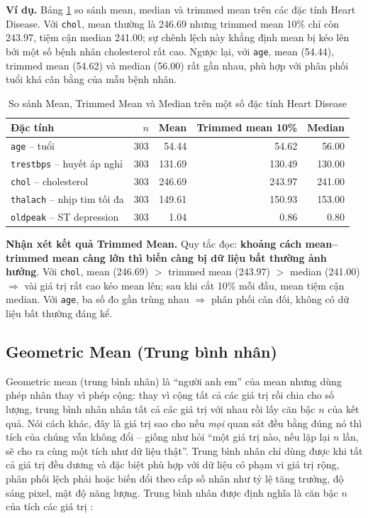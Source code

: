 \textbf{Ví dụ.} Bảng \ref{tab:chapter1_trimmed_example} so sánh mean, median và trimmed mean trên các đặc tính Heart Disease. Với \texttt{chol}, mean thường là 246.69 nhưng trimmed mean 10\% chỉ còn 243.97, tiệm cận median 241.00; sự chênh lệch này khẳng định mean bị kéo lên bởi một số bệnh nhân cholesterol rất cao. Ngược lại, với \texttt{age}, mean (54.44), trimmed mean (54.62) và median (56.00) rất gần nhau, phù hợp với phân phối tuổi khá cân bằng của mẫu bệnh nhân.

\begin{table}[H]
\centering
\caption{So sánh Mean, Trimmed Mean và Median trên một số đặc tính Heart Disease}
\label{tab:chapter1_trimmed_example}
\small
\begin{tabular}{lrrrr}
\toprule
Đặc tính & $n$ & Mean & Trimmed mean 10\% & Median \\
\midrule
\texttt{age} -- tuổi & 303 & 54.44 & 54.62 & 56.00 \\
\texttt{trestbps} -- huyết áp nghỉ & 303 & 131.69 & 130.49 & 130.00 \\
\texttt{chol} -- cholesterol & 303 & 246.69 & 243.97 & 241.00 \\
\texttt{thalach} -- nhịp tim tối đa & 303 & 149.61 & 150.93 & 153.00 \\
\texttt{oldpeak} -- ST depression & 303 & 1.04 & 0.86 & 0.80 \\
\bottomrule
\end{tabular}
\end{table}

\textbf{Nhận xét kết quả Trimmed Mean.} Quy tắc đọc: \textbf{khoảng cách mean--trimmed mean càng lớn thì biến càng bị dữ liệu bất thường ảnh hưởng}. Với \texttt{chol}, mean (246.69) $>$ trimmed mean (243.97) $>$ median (241.00) $\Rightarrow$ vài giá trị rất cao kéo mean lên; sau khi cắt 10\% mỗi đầu, mean tiệm cận median. Với \texttt{age}, ba số đo gần trùng nhau $\Rightarrow$ phân phối cân đối, không có dữ liệu bất thường đáng kể.

\subsection{Geometric Mean (Trung bình nhân)}

Geometric mean (trung bình nhân) là ``người anh em'' của mean nhưng dùng phép nhân thay vì phép cộng: thay vì cộng tất cả các giá trị rồi chia cho số lượng, trung bình nhân nhân tất cả các giá trị với nhau rồi lấy căn bậc $n$ của kết quả. Nói cách khác, đây là giá trị sao cho nếu \textit{mọi} quan sát đều bằng đúng nó thì tích của chúng vẫn không đổi -- giống như hỏi ``một giá trị nào, nếu lặp lại $n$ lần, sẽ cho ra cùng một tích như dữ liệu thật''. Trung bình nhân chỉ dùng được khi tất cả giá trị đều dương và đặc biệt phù hợp với dữ liệu có phạm vi giá trị rộng, phân phối lệch phải hoặc biến đổi theo cấp số nhân như tỷ lệ tăng trưởng, độ sáng pixel, mật độ năng lượng. Trung bình nhân được định nghĩa là căn bậc $n$ của tích các giá trị \cite{NIST2013Handbook}:

